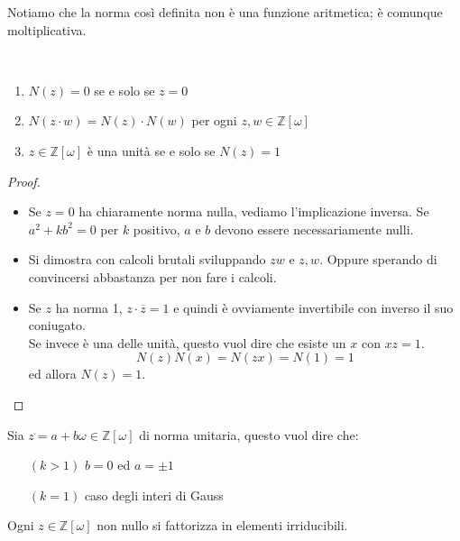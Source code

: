 \begin{osservazione}
	Notiamo che la norma così definita non è una funzione aritmetica; è comunque moltiplicativa.
\end{osservazione}
\begin{proposizione}\
	\begin{enumerate}
		\item $N(z)=0$ se e solo se $z=0$
		\item $N(z\cdot w)=N(z)\cdot N(w)$ per ogni $z,w\in\mathbb{Z}[\omega]$
		\item $z\in\mathbb{Z}[\omega]$ è una unità se e solo se $N(z)=1$
	\end{enumerate}
\end{proposizione}
\begin{proof}\
	\begin{itemize}
		\item Se $z=0$ ha chiaramente norma nulla, vediamo l'implicazione inversa. Se $a^2+kb^2=0$ per $k$ positivo, $a$ e $b$ devono essere necessariamente nulli.
		\item Si dimostra con calcoli brutali sviluppando $zw$ e $z,w$. Oppure sperando di convincersi abbastanza per non fare i calcoli.
		\item Se $z$ ha norma 1, $z\cdot\overline{z}=1$ e quindi è ovviamente invertibile con inverso il suo coniugato.\\
		Se invece è una delle unità, questo vuol dire che esiste un $x$ con $xz=1$. 
		\begin{equation*}
			N(z)N(x) = N(zx)=N(1)=1
		\end{equation*}
		ed allora $N(z)=1$.
	\end{itemize}
\end{proof}
\begin{osservazione}
	Sia $z=a+b\omega\in\mathbb{Z}[\omega]$ di norma unitaria, questo vuol dire che:
	\begin{itemize}
		\item[$(k>1)$] $b=0$ ed $a=\pm1$
		\item[$(k=1)$] caso degli interi di Gauss
	\end{itemize}
\end{osservazione}
\begin{teorema}
	Ogni $z\in\mathbb{Z}[\omega]$ non nullo si fattorizza in elementi irriducibili.
\end{teorema}
